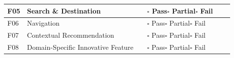 \begin{longtable}{|L{0.072}|L{0.191}|L{0.271}|L{0.135}|L{0.163}|L{0.168}|}
F05 & Search \& Destination &  & \(\square\) Pass\newline \(\square\) Partial\newline \(\square\) Fail &  &  \\ \hline
F06 & Navigation &  & \(\square\) Pass\newline \(\square\) Partial\newline \(\square\) Fail &  &  \\ \hline
F07 & Contextual Recommendation &  & \(\square\) Pass\newline \(\square\) Partial\newline \(\square\) Fail &  &  \\ \hline
F08 & Domain-Specific Innovative Feature &  & \(\square\) Pass\newline \(\square\) Partial\newline \(\square\) Fail &  &  \\ \hline
\end{longtable}
